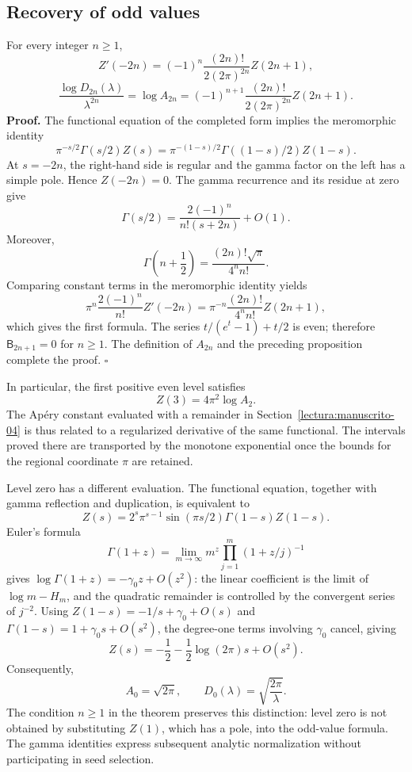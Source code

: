 \subsection{Recovery of odd values}
For every integer $n\geq1$,
\[
 Z'(-2n)=(-1)^n\frac{(2n)!}{2(2\pi)^{2n}}Z(2n+1),
\]
\[
 \frac{\log D_{2n}(\lambda)}{\lambda^{2n}}
 =\log A_{2n}
 =(-1)^{n+1}\frac{(2n)!}{2(2\pi)^{2n}}Z(2n+1).
\]
\textbf{Proof.} The functional equation of the completed form implies
the meromorphic identity
\[
 \pi^{-s/2}\Gamma(s/2)Z(s)
 =\pi^{-(1-s)/2}\Gamma((1-s)/2)Z(1-s).
\]
At $s=-2n$, the right-hand side is regular and the gamma factor on
the left has a simple pole. Hence $Z(-2n)=0$. The gamma recurrence
and its residue at zero give
\[
 \Gamma(s/2)=\frac{2(-1)^n}{n!(s+2n)}+O(1).
\]
Moreover,
\[
 \Gamma\!\left(n+\frac12\right)
 =\frac{(2n)!\sqrt\pi}{4^nn!}.
\]
Comparing constant terms in the meromorphic identity yields
\[
 \pi^n\frac{2(-1)^n}{n!}Z'(-2n)
 =\pi^{-n}\frac{(2n)!}{4^nn!}Z(2n+1),
\]
which gives the first formula. The series $t/(e^t-1)+t/2$ is even;
therefore $\mathsf B_{2n+1}=0$ for $n\geq1$. The definition of
$A_{2n}$ and the preceding proposition complete the proof.
\hfill$\square$

In particular, the first positive even level satisfies
\[
 Z(3)=4\pi^2\log A_2.
\]
The Ap\'ery constant evaluated with a remainder in
Section~\ref{lectura:manuscrito-04} is thus related to a regularized
derivative of the same functional. The intervals proved there are
transported by the monotone exponential once the bounds for the
regional coordinate $\pi$ are retained.

Level zero has a different evaluation. The functional equation,
together with gamma reflection and duplication, is equivalent to
\[
 Z(s)=2^s\pi^{s-1}\sin(\pi s/2)\Gamma(1-s)Z(1-s).
\]
Euler's formula
\[
 \Gamma(1+z)=\lim_{m\to\infty}
 m^z\prod_{j=1}^{m}(1+z/j)^{-1}
\]
gives $\log\Gamma(1+z)=-\gamma_0z+O(z^2)$: the linear coefficient
is the limit of $\log m-H_m$, and the quadratic remainder is controlled
by the convergent series of $j^{-2}$. Using
$Z(1-s)=-1/s+\gamma_0+O(s)$ and
$\Gamma(1-s)=1+\gamma_0s+O(s^2)$, the degree-one terms involving
$\gamma_0$ cancel, giving
\[
 Z(s)=-\frac12-\frac12\log(2\pi)s+O(s^2).
\]
Consequently,
\[
 A_0=\sqrt{2\pi},\qquad D_0(\lambda)=\sqrt{\frac{2\pi}{\lambda}}.
\]
The condition $n\geq1$ in the theorem preserves this distinction:
level zero is not obtained by substituting $Z(1)$, which has a pole,
into the odd-value formula. The gamma identities express subsequent
analytic normalization without participating in seed selection.
